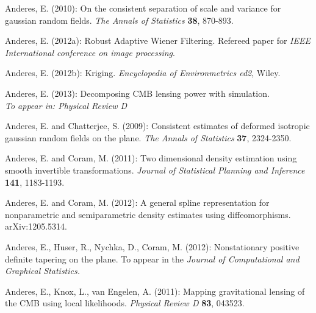 \documentclass[12pt]{article}
\begin{document}
\begin{enumerate}[labelindent=0pt,label={[\arabic*]}]

\item\label{A1}
Anderes, E. (2010):  On the consistent separation of scale and variance for gaussian random fields. \textit{The Annals of Statistics} {\bf 38}, 870-893.


\item\label{A2}
Anderes, E. (2012a):  Robust Adaptive Wiener Filtering.  Refereed paper for \textit{IEEE International conference on image processing}.


\item\label{A3}
Anderes, E. (2012b): Kriging.  \textit{Encyclopedia of Environmetrics ed2}, Wiley.


\item \label{A4}
Anderes, E. (2013):
Decomposing CMB lensing power with simulation. \\
\textit{To appear in: Physical Review D}

\item\label{AC}
Anderes, E. and Chatterjee, S. (2009): Consistent estimates of deformed isotropic gaussian random fields on the plane. \textit{The Annals of Statistics} {\bf 37}, 2324-2350.


\item\label{ACo1}
Anderes, E. and Coram, M. (2011):   Two dimensional density estimation using smooth invertible transformations.
 \textit{Journal of Statistical Planning and Inference} {\bf 141}, 1183-1193.




\item\label{ACo2}
Anderes, E. and Coram, M. (2012):  A general spline representation for nonparametric and semiparametric density estimates using diffeomorphisms.  arXiv:1205.5314.




\item\label{AH}
Anderes, E., Huser, R., Nychka, D., Coram, M. (2012): Nonstationary positive definite tapering on the plane. To appear in the \textit{Journal of Computational and Graphical Statistics.}




\item\label{AK}
Anderes, E., Knox, L., van Engelen, A.  (2011):  Mapping gravitational lensing of the CMB using local likelihoods.
\textit{Physical Review D} {\bf 83}, 043523.







\end{enumerate}
\end{document}
